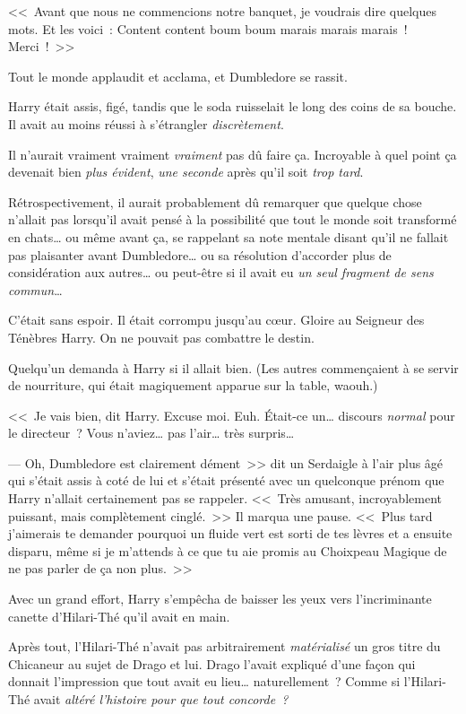 <<~Avant que nous ne commencions notre banquet, je voudrais dire quelques mots. Et les voici~: Content content boum boum marais marais marais~! Merci~!~>>

Tout le monde applaudit et acclama, et Dumbledore se rassit.

Harry était assis, figé, tandis que le soda ruisselait le long des coins de sa bouche. Il avait au moins réussi à s'étrangler \emph{discrètement}.

Il n'aurait vraiment vraiment \emph{vraiment} pas dû faire ça. Incroyable à quel point ça devenait bien \emph{plus évident}, \emph{une seconde} après qu'il soit \emph{trop tard}.

Rétrospectivement, il aurait probablement dû remarquer que quelque chose n'allait pas lorsqu'il avait pensé à la possibilité que tout le monde soit transformé en chats… ou même avant ça, se rappelant sa note mentale disant qu'il ne fallait pas plaisanter avant Dumbledore… ou sa résolution d'accorder plus de considération aux autres… ou peut-être si il avait eu \emph{un seul fragment de sens commun}…

C'était sans espoir. Il était corrompu jusqu'au cœur. Gloire au Seigneur des Ténèbres Harry. On ne pouvait pas combattre le destin.

Quelqu'un demanda à Harry si il allait bien. (Les autres commençaient à se servir de nourriture, qui était magiquement apparue sur la table, waouh.)

<<~Je vais bien, dit Harry. Excuse moi. Euh. Était-ce un… discours \emph{normal} pour le directeur~? Vous n'aviez… pas l'air… très surpris…

--- Oh, Dumbledore est clairement dément~>> dit un Serdaigle à l'air plus âgé qui s'était assis à coté de lui et s'était présenté avec un quelconque prénom que Harry n'allait certainement pas se rappeler. <<~Très amusant, incroyablement puissant, mais complètement cinglé.~>> Il marqua une pause. <<~Plus tard j'aimerais te demander pourquoi un fluide vert est sorti de tes lèvres et a ensuite disparu, même si je m'attends à ce que tu aie promis au Choixpeau Magique de ne pas parler de ça non plus.~>>

Avec un grand effort, Harry s'empêcha de baisser les yeux vers l'incriminante canette d'Hilari-Thé qu'il avait en main.

Après tout, l'Hilari-Thé n'avait pas arbitrairement \emph{matérialisé} un gros titre du Chicaneur au sujet de Drago et lui. Drago l'avait expliqué d'une façon qui donnait l'impression que tout avait eu lieu… naturellement~? Comme si l'Hilari-Thé avait \emph{altéré l'histoire pour que tout concorde~?}

